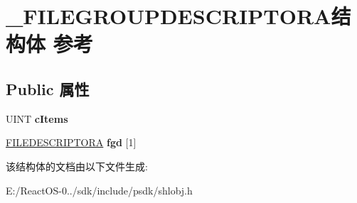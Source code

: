 \hypertarget{struct___f_i_l_e_g_r_o_u_p_d_e_s_c_r_i_p_t_o_r_a}{}\section{\+\_\+\+F\+I\+L\+E\+G\+R\+O\+U\+P\+D\+E\+S\+C\+R\+I\+P\+T\+O\+R\+A结构体 参考}
\label{struct___f_i_l_e_g_r_o_u_p_d_e_s_c_r_i_p_t_o_r_a}
\subsection*{Public 属性}
\begin{DoxyCompactItemize}
\item 
\mbox{\label{struct___f_i_l_e_g_r_o_u_p_d_e_s_c_r_i_p_t_o_r_a_a864f638e1b008ad6bf7f4903eb62da82}} 
U\+I\+NT {\bfseries c\+Items}
\item 
\mbox{\label{struct___f_i_l_e_g_r_o_u_p_d_e_s_c_r_i_p_t_o_r_a_a16fad1ef29e1bdbf7e2ddc0ef551a585}} 
\hyperlink{struct___f_i_l_e_d_e_s_c_r_i_p_t_o_r_a}{F\+I\+L\+E\+D\+E\+S\+C\+R\+I\+P\+T\+O\+RA} {\bfseries fgd} \mbox{[}1\mbox{]}
\end{DoxyCompactItemize}


该结构体的文档由以下文件生成\+:\begin{DoxyCompactItemize}
\item 
E\+:/\+React\+O\+S-\/0../sdk/include/psdk/shlobj.\+h\end{DoxyCompactItemize}
